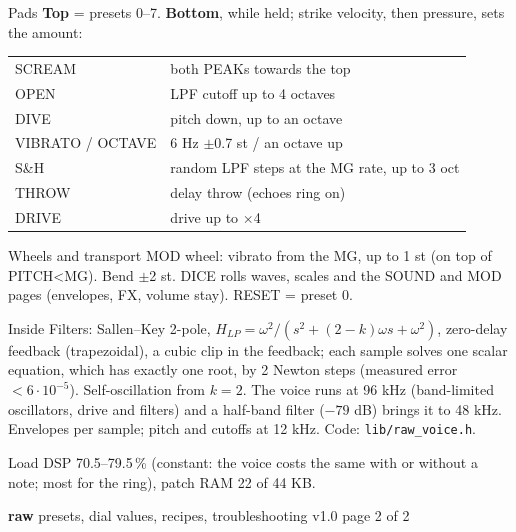 \documentclass{article}
\newcommand{\FX}[1]{\textcolor{fxc}{#1}}
\newcommand{\VC}[1]{\textcolor{vcoc}{#1}}
\newcommand{\FL}[1]{\textcolor{fltc}{#1}}
\begin{document}
\begin{minipage}[t]{66mm}\vspace{0pt}
\begin{card}{Pads}
\textbf{Top} = presets 0--7. \textbf{Bottom}, while held; strike velocity, then pressure, sets the amount:
\fontsize{6.6}{7.9}\selectfont
\begin{tabularx}{\linewidth}{@{}l L@{}}
\FL{SCREAM} & both PEAKs towards the top \\
\FL{OPEN} & LPF cutoff up to 4 octaves \\
\VC{DIVE} & pitch down, up to an octave \\
\VC{VIBRATO / OCTAVE} & 6 Hz \(\pm\)0.7 st / an octave up \\
\FL{S\&H} & random LPF steps at the MG rate, up to 3 oct \\
\FX{THROW} & delay throw (echoes ring on) \\
\FX{DRIVE} & drive up to \(\times\)4 \\
\end{tabularx}
\end{card}
\begin{card}{Wheels and transport}
MOD wheel: vibrato from the MG, up to 1 st (on top of PITCH<MG). Bend \(\pm\)2 st.
DICE rolls waves, scales and the SOUND and MOD pages (envelopes, FX, volume stay). RESET = preset 0.
\end{card}
\end{minipage}\hfill
\begin{minipage}[t]{68mm}\vspace{0pt}
\begin{card}{Inside}
\fontsize{6.6}{7.8}\selectfont
Filters: Sallen--Key 2-pole, \(H_{LP} = \omega^2/(s^2 + (2-k)\omega s + \omega^2)\), zero-delay feedback
(trapezoidal), a cubic clip in the feedback; each sample solves one scalar equation, which has
exactly one root, by 2 Newton steps (measured error \(< 6\cdot10^{-5}\)). Self-oscillation from \(k = 2\).
The voice runs at 96 kHz (band-limited oscillators, drive and filters) and a half-band filter
(\(-79\) dB) brings it to 48 kHz. Envelopes per sample; pitch and cutoffs at 12 kHz.
Code: \texttt{lib/raw\_voice.h}.
\end{card}
\begin{card}{Load}
DSP 70.5--79.5\,\% (constant: the voice costs the same with or without a note; most for the ring), patch RAM 22 of 44 KB.
\end{card}
\end{minipage}

\newpage
{\fontsize{16}{18}\selectfont\bfseries raw}\hspace{3mm}%
{\fontsize{9.5}{11}\selectfont presets, dial values, recipes, troubleshooting}\hfill
{\fontsize{7}{8}\selectfont\color{black!55} v1.0 \textperiodcentered{} page 2 of 2}
\end{document}
